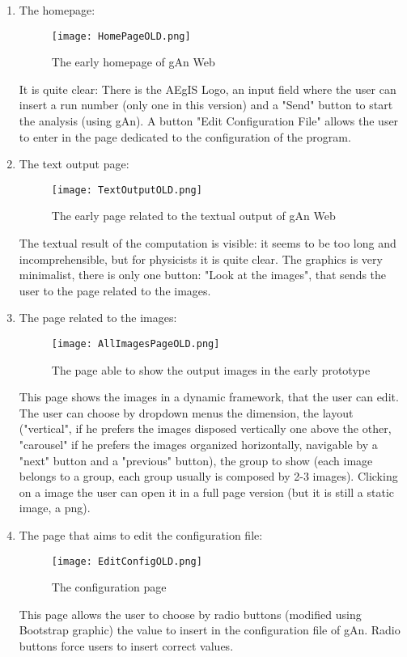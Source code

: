 \begin{enumerate}
\item The homepage:

\begin{figure}[H]
\centering
\texttt{[image: HomePageOLD.png]} 
\caption{The early homepage of gAn Web}
\end{figure}

It is quite clear: There is the AEgIS Logo, an input field where the user can insert a run number (only one in this version) and a "Send" button to start the analysis (using gAn). A button "Edit Configuration File" allows the user to  enter in the page dedicated to the configuration of the program.

\item The text output page:

\begin{figure}[H]
\centering
\texttt{[image: TextOutputOLD.png]} 
\caption{The early page related to the textual output of gAn Web}
\end{figure}
  
The textual result of the computation is visible: it seems to be too long and incomprehensible, but for physicists it is quite clear. The graphics is very minimalist, there is only one button: "Look at the images", that sends the user to the page related to the images. 



\item The page related to the images:

\begin{figure}[H]
\centering
\texttt{[image: AllImagesPageOLD.png]}
\caption{The page able to show the output images in the early prototype}
\end{figure}   

This page shows the images in a dynamic framework, that the user can edit.
The user can choose by dropdown menus the dimension, the layout ("vertical", if he prefers the images disposed vertically one above the other, "carousel" if he prefers the images organized horizontally, navigable by a "next" button and a "previous" button), the group to show (each image belongs to a group, each group usually is composed by 2-3 images). Clicking on a image the user can open it in a full page version (but it is still a static image, a png).


\item The page that aims to edit the configuration file:

\begin{figure}[H]
\centering
\texttt{[image: EditConfigOLD.png]}  
\caption{The configuration page}
\end{figure}   

This page allows the user to choose by radio buttons (modified using Bootstrap graphic) the value to insert in the configuration file of gAn. Radio buttons force users to insert correct values.    

\end{enumerate}

